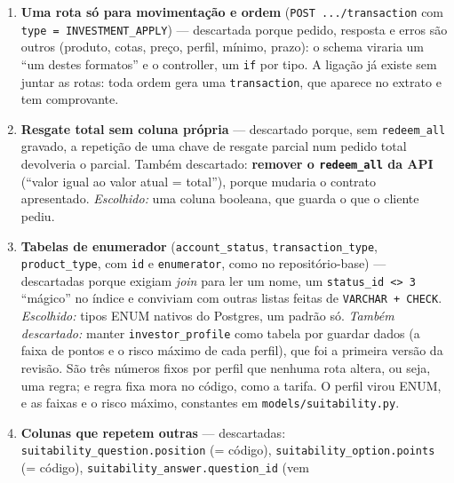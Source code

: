 \documentclass[11pt,a4paper]{article}
\newcommand{\tb}[1]{\texttt{#1}}           %
\begin{document}
\begin{enumerate}
  em \rota|/customer/{ck}/account/{ak}/|. Eram dois padrões de caminho para a mesma dona.
  \emph{Escolhido:} as rotas de ordem e posição aninhadas na conta, com o mesmo formato das
  movimentações (\tb{.../investment_order} cria e consulta, \tb{.../investment_orders} lista). O
  cliente diz de qual conta sai o dinheiro, e a conta de outro cliente dá 404 como em todo o
  resto. Sumiu o erro \tb{PPP007006} (cliente sem conta ativa): conta inexistente agora é 404
  (\tb{PPP002001}), e conta bloqueada ou encerrada é \tb{PPP002005}. Suitability e carteira
  sugerida continuam no cliente, porque o perfil é da pessoa.
  \item \textbf{Uma rota só para movimentação e ordem} (\tb{POST .../transaction} com
  \tb{type = INVESTMENT_APPLY}) --- descartada porque pedido, resposta e erros são outros
  (produto, cotas, preço, perfil, mínimo, prazo): o schema viraria um ``um destes formatos'' e o
  controller, um \tb{if} por tipo. A ligação já existe sem juntar as rotas: toda ordem gera uma
  \tb{transaction}, que aparece no extrato e tem comprovante.
  \item \textbf{Resgate total sem coluna própria} --- descartado porque, sem \tb{redeem_all}
  gravado, a repetição de uma chave de resgate parcial num pedido total devolveria o parcial.
  Também descartado: \textbf{remover o \tb{redeem_all} da API} (``valor igual ao valor atual =
  total''), porque mudaria o contrato apresentado. \emph{Escolhido:} uma coluna booleana, que
  guarda o que o cliente pediu.
  \item \textbf{Tabelas de enumerador} (\tb{account_status}, \tb{transaction_type},
  \tb{product_type}, com \tb{id} e \tb{enumerator}, como no repositório-base) --- descartadas porque
  exigiam \emph{join} para ler um nome, um \tb{status_id <> 3} ``mágico'' no índice e conviviam com
  outras listas feitas de \tb{VARCHAR + CHECK}. \emph{Escolhido:} tipos ENUM nativos do Postgres,
  um padrão só. \emph{Também descartado:} manter \tb{investor_profile} como tabela por guardar
  dados (a faixa de pontos e o risco máximo de cada perfil), que foi a primeira versão da revisão.
  São três números fixos por perfil que nenhuma rota altera, ou seja, uma regra; e regra fixa mora no
  código, como a tarifa. O perfil virou ENUM, e as faixas e o risco máximo, constantes em
  \tb{models/suitability.py}.
  \item \textbf{Colunas que repetem outras} --- descartadas: \tb{suitability_question.position}
  (= código), \tb{suitability_option.points} (= código), \tb{suitability_answer.question_id} (vem

\end{enumerate}
\end{document}
